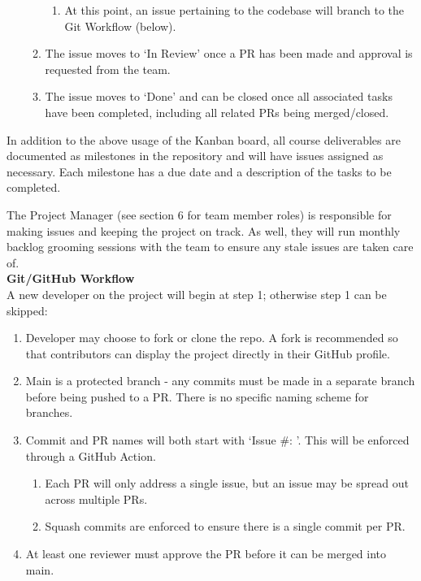 \documentclass{article}
\begin{document}
\begin{enumerate}
\begin{enumerate}
    \begin{enumerate}
      \item At this point, an issue pertaining to the codebase will branch to the Git Workflow (below).
    \end{enumerate}
    \item The issue moves to ‘In Review’ once a PR has been made and approval is requested from the team.
    \item The issue moves to ‘Done’ and can be closed once all associated tasks have been completed, including all related PRs being merged/closed.
  \end{enumerate}

\end{enumerate}

In addition to the above usage of the Kanban board, all course deliverables are documented as milestones in the repository and will have issues assigned as necessary. Each milestone has a due date and a description of the tasks to be completed.

The Project Manager (see section 6 for team member roles) is responsible for making issues and keeping the project on track. As well, they will run monthly backlog grooming sessions with the team to ensure any stale issues are taken care of. \\

\noindent
\textbf{Git/GitHub Workflow}\\
A new developer on the project will begin at step 1; otherwise step 1 can be skipped:
\begin{enumerate}
  \item Developer may choose to fork or clone the repo. A fork is recommended so that contributors can display the project directly in their GitHub profile.
  \item Main is a protected branch - any commits must be made in a separate branch before being pushed to a PR. There is no specific naming scheme for branches.
  \item Commit and PR names will both start with ‘Issue \#: ’. This will be enforced through a GitHub Action.
  \begin{enumerate}
    \item Each PR will only address a single issue, but an issue may be spread out across multiple PRs.
    \item Squash commits are enforced to ensure there is a single commit per PR.
  \end{enumerate}
  \item At least one reviewer must approve the PR before it can be merged into main.\\
\end{enumerate}
\end{document}
